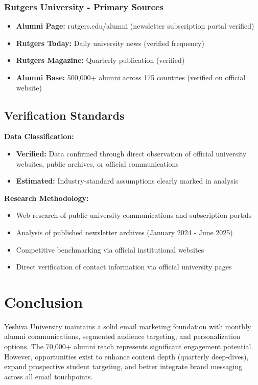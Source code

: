 \documentclass[12pt,letterpaper]{article}
\begin{document}
\subsubsection{Rutgers University - Primary Sources}
\begin{itemize}[leftmargin=*]
    \item \textbf{Alumni Page:} rutgers.edu/alumni (newsletter subscription portal verified)
    \item \textbf{Rutgers Today:} Daily university news (verified frequency)
    \item \textbf{Rutgers Magazine:} Quarterly publication (verified)
    \item \textbf{Alumni Base:} 500,000+ alumni across 175 countries (verified on official website)
\end{itemize}

\subsection{Verification Standards}

\textbf{Data Classification:}
\begin{itemize}[leftmargin=*]
    \item \textbf{Verified:} Data confirmed through direct observation of official university websites, public archives, or official communications
    \item \textbf{Estimated:} Industry-standard assumptions clearly marked in analysis
\end{itemize}

\textbf{Research Methodology:}
\begin{itemize}[leftmargin=*]
    \item Web research of public university communications and subscription portals
    \item Analysis of published newsletter archives (January 2024 - June 2025)
    \item Competitive benchmarking via official institutional websites
    \item Direct verification of contact information via official university pages
\end{itemize}

\section{Conclusion}

Yeshiva University maintains a solid email marketing foundation with monthly alumni communications, segmented audience targeting, and personalization options. The 70,000+ alumni reach represents significant engagement potential. However, opportunities exist to enhance content depth (quarterly deep-dives), expand prospective student targeting, and better integrate brand messaging across all email touchpoints.
\end{document}
